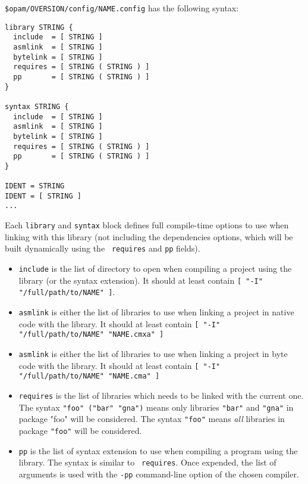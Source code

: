 \documentclass[a4paper,11pt]{article}
\begin{document}
\verb+$opam/OVERSION/config/NAME.config+ has the following syntax:

\begin{verbatim}
library STRING {
  include  = [ STRING ]
  asmlink  = [ STRING ]
  bytelink = [ STRING ]
  requires = [ STRING ( STRING ) ]
  pp       = [ STRING ( STRING ) ]
}

syntax STRING {
  include  = [ STRING ]
  asmlink  = [ STRING ]
  bytelink = [ STRING ]
  requires = [ STRING ( STRING ) ]
  pp       = [ STRING ( STRING ) ]
}

IDENT = STRING
IDENT = [ STRING ]
...
\end{verbatim}

Each {\tt library} and {\tt syntax} block defines full compile-time
options to use when linking with this library (not including the
dependencies options, which will be built dynamically using the {\tt
  requires} and {\tt pp} fields).\\

\begin{itemize}

\item {\tt include} is the list of directory to open when compiling a
  project using the library (or the syntax extension). It should at
  least contain \verb+[ "-I" "/full/path/to/NAME" ]+.

\item {\tt asmlink} is either the list of libraries to use when
  linking a project in native code with the library. It should at
  least contain \verb+[ "-I" "/full/path/to/NAME" "NAME.cmxa" ]+

\item {\tt asmlink} is either the list of libraries to use when
  linking a project in byte code with the library. It should at least
  contain \verb+[ "-I" "/full/path/to/NAME" "NAME.cma" ]+

\item {\tt requires} is the list of libraries which needs to be linked
  with the current one. The syntax \verb+"foo" ("bar" "gna")+ means
  only libraries {\tt "bar"} and {\tt "gna"} in package "foo" will be
  considered. The syntax {\tt "foo"} means {\em all} libraries in
  package {\tt "foo"} will be considered.

\item {\tt pp} is the list of syntax extension to use when compiling a
  program using the library. The syntax is similar to {\tt
    requires}. Once expended, the list of arguments is used with the
  {\tt -pp} command-line option of the chosen compiler.

\end{itemize}
\end{document}
